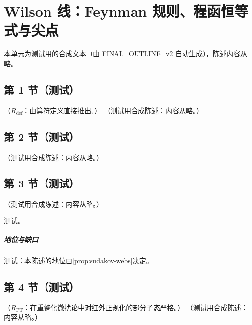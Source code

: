 \chapter{Wilson 线：Feynman 规则、程函恒等式与尖点}\label{app:appB}
本单元为测试用的合成文本（由 FINAL\_OUTLINE\_v2 自动生成），陈述内容从略。

\section{第 1 节（测试）}\label{sec:appB-definition}

\begin{proposition}\label{prop:appB-rules}
（$R_{\mathrm{def}}$：由算符定义直接推出。）
（测试用合成陈述：内容从略。）
\end{proposition}

\section{第 2 节（测试）}\label{sec:appB-rules}

\begin{lemma}\label{lem:appB-shuffle}
（测试用合成陈述：内容从略。）
\end{lemma}

\section{第 3 节（测试）}\label{sec:appB-eikonal}

\begin{proposition}\label{prop:appB-webs}
（测试用合成陈述：内容从略。）
\end{proposition}
\begin{proofsketch}测试。\end{proofsketch}
\paragraph{地位与缺口}测试：本陈述的地位由\cref{prop:sudakov-webs}决定。

\section{第 4 节（测试）}\label{sec:appB-cusp}

\begin{proposition}\label{prop:appB-cusp-oneloop}
（$R_{\mathrm{PT}}$：在重整化微扰论中对红外正规化的部分子态严格。）
（测试用合成陈述：内容从略。）
\end{proposition}
